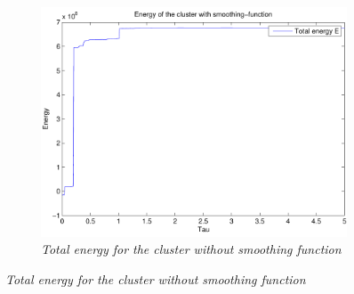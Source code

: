\documentclass[a4paper,12pt, english]{article}
\begin{document}
\begin{figure}[H]
		\begin{subfigure}[b]{0.6\textwidth}
        \includegraphics[scale=0.5]{tot_e_withouth_smooth.pdf}
        \caption{\textit{Total energy for the cluster without smoothing function}}
		\end{subfigure}
		
		\label{fig:kin_pot_notsmooth}        
\end{figure}
\end{document}
